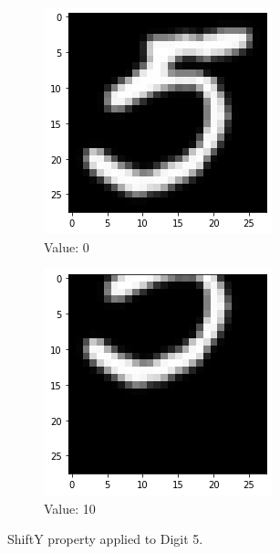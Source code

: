 \begin{figure}[htb!]
\begin{subfigure}[b]{.3\textwidth}
            \includegraphics[width=\textwidth]{images/shifty2.png}
            \caption{Value: 0}
            \label{fig:Rotate-misclass0}
        \end{subfigure}%
        \begin{subfigure}[b]{.3\textwidth}
            \centering
            \includegraphics[width=\linewidth]{images/shifty3.png}
            \caption{Value: 10}
            \label{fig:Rotate-misclass0}
        \end{subfigure}
        
        \caption{ShiftY property applied to Digit 5.}
        \label{fig:ShiftY-property}
    \end{figure}
    \FloatBarrier

